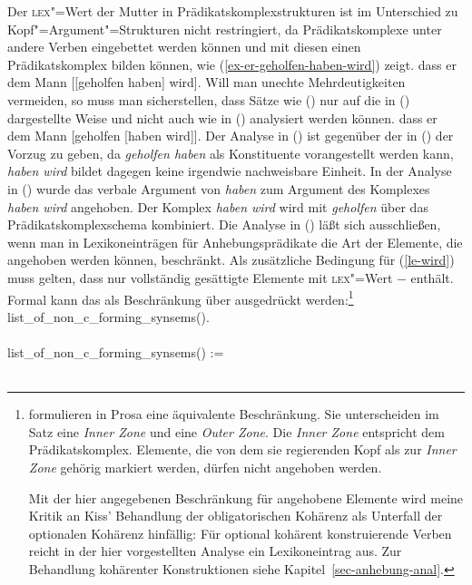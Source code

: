 Der \textsc{lex}"=Wert der Mutter in Prädikatskomplexstrukturen ist im Unterschied zu Kopf"=Argument"=Strukturen
nicht restringiert, da Prädikatskomplexe unter andere Verben eingebettet werden können 
und mit diesen einen Prädikatskomplex bilden können, wie (\ref{ex-er-geholfen-haben-wird}) zeigt.
\ea
\label{ex-er-geholfen-haben-wird}
dass er dem Mann [[geholfen haben] wird].
\z
Will man unechte Mehrdeutigkeiten vermeiden, so muss man sicherstellen, dass Sätze wie () nur auf die
in () dargestellte Weise und nicht auch wie in () analysiert werden können.
\ea
\label{bsp-non-complex-forming}
dass er dem Mann [geholfen [haben wird]].
\z
Der Analyse in () ist gegenüber der in () der Vorzug zu geben, da \emph{geholfen
haben} als Konstituente vorangestellt werden kann, \emph{haben wird} bildet dagegen keine irgendwie
nachweisbare Einheit.
In der Analyse in () wurde das verbale Argument von \emph{haben} zum Argument des Komplexes
\emph{haben wird} angehoben. Der Komplex \emph{haben wird} wird mit \emph{geholfen} über das Prädikatskomplexschema
kombiniert. Die Analyse in () läßt sich ausschließen, wenn man in Lexikoneinträgen für Anhebungsprädikate
die Art der Elemente, die angehoben werden können, beschränkt. Als zusätzliche Bedingung
für (\ref{le-wird}) muss gelten, dass  nur vollständig gesättigte
Elemente mit \textsc{lex}"=Wert $-$ enthält. Formal kann das als Beschränkung über 
ausgedrückt werden:\footnote{
        \citet{BvN98a} formulieren in Prosa eine äquivalente Beschränkung. Sie unterscheiden
        im Satz eine \emph{Inner Zone} und eine \emph{Outer Zone}. Die \emph{Inner Zone}
        entspricht dem Prädikatskomplex. Elemente, die von dem sie regierenden Kopf
        als zur \emph{Inner Zone} gehörig markiert werden, dürfen nicht angehoben werden.

Mit der hier angegebenen Beschränkung für angehobene Elemente wird
        meine Kritik \citep[--352]{Mueller99a} an Kiss' Behandlung der obligatorischen Kohärenz
        als Unterfall der optionalen Kohärenz \citep[]{Kiss95a} hinfällig: Für optional kohärent konstruierende
        Verben reicht in der hier vorgestellten Analyse ein Lexikoneintrag aus. Zur Behandlung
        kohärenter Konstruktionen siehe Kapitel~\ref{sec-anhebung-anal}.%
%
}
\eas
\label{constr-non-complex-forming}
list\_of\_non\_c\_forming\_synsems(\eliste).\\\\
list\_of\_non\_c\_forming\_synsems() :=\\\\
